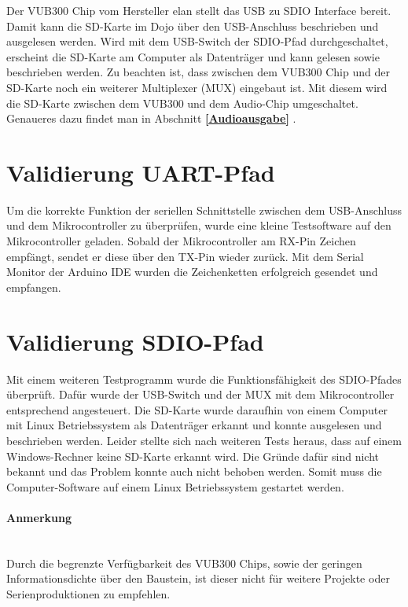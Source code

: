 Der VUB300 Chip vom Hersteller elan stellt das USB zu SDIO Interface bereit. Damit kann die SD-Karte im Dojo über den USB-Anschluss beschrieben und ausgelesen werden. Wird mit dem USB-Switch der SDIO-Pfad durchgeschaltet, erscheint die SD-Karte am Computer als Datenträger und kann gelesen sowie beschrieben werden. Zu beachten ist, dass zwischen dem VUB300 Chip und der SD-Karte noch ein weiterer Multiplexer (MUX) eingebaut ist. Mit diesem wird die SD-Karte zwischen dem VUB300 und dem Audio-Chip umgeschaltet. Genaueres dazu findet man in Abschnitt \textbf{\ref{Audioausgabe} }.




\section{Validierung UART-Pfad}

Um die korrekte Funktion der seriellen Schnittstelle zwischen dem USB-Anschluss und dem Mikrocontroller zu überprüfen, wurde eine kleine Testsoftware auf den Mikrocontroller geladen. Sobald der Mikrocontroller am RX-Pin Zeichen empfängt, sendet	er diese über den TX-Pin wieder zurück. Mit dem Serial Monitor der Arduino IDE wurden die Zeichenketten erfolgreich gesendet und empfangen.

\section{Validierung SDIO-Pfad}

Mit einem weiteren Testprogramm wurde die Funktionsfähigkeit des SDIO-Pfades überprüft. Dafür wurde der USB-Switch und der MUX mit dem Mikrocontroller entsprechend angesteuert. Die SD-Karte wurde daraufhin von einem Computer mit Linux Betriebssystem als Datenträger erkannt und konnte ausgelesen und beschrieben werden. Leider stellte sich nach weiteren Tests heraus, dass auf einem Windows-Rechner keine SD-Karte erkannt wird. Die Gründe dafür sind nicht bekannt und das Problem konnte auch nicht behoben werden. Somit muss die Computer-Software auf einem Linux Betriebssystem gestartet werden.
\paragraph{Anmerkung}$ $\\
Durch die begrenzte Verfügbarkeit des VUB300 Chips, sowie der geringen Informationsdichte über den Baustein, ist dieser nicht für weitere Projekte oder Serienproduktionen zu empfehlen.